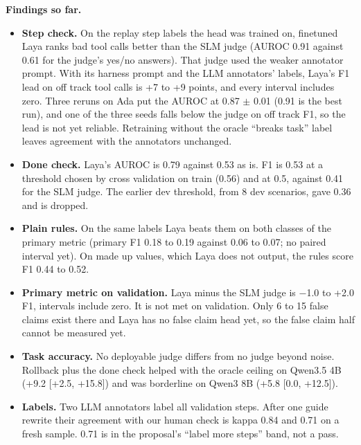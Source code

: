 \documentclass[10pt,a4paper]{article}
\begin{document}
\textbf{Findings so far.}
\begin{itemize}
  \item \textbf{Step check.} On the replay step labels the head was trained on, finetuned Laya ranks bad tool calls better than the SLM judge (AUROC 0.91 against 0.61 for the judge's yes/no answers). That judge used the weaker annotator prompt. With its harness prompt and the LLM annotators' labels, Laya's F1 lead on off track tool calls is +7 to +9 points, and every interval includes zero. Three reruns on Ada put the AUROC at 0.87 $\pm$ 0.01 (0.91 is the best run), and one of the three seeds falls below the judge on off track F1, so the lead is not yet reliable. Retraining without the oracle ``breaks task'' label leaves agreement with the annotators unchanged.
  \item \textbf{Done check.} Laya's AUROC is 0.79 against 0.53 as is. F1 is 0.53 at a threshold chosen by cross validation on train (0.56) and at 0.5, against 0.41 for the SLM judge. The earlier dev threshold, from 8 dev scenarios, gave 0.36 and is dropped.
  \item \textbf{Plain rules.} On the same labels Laya beats them on both classes of the primary metric (primary F1 0.18 to 0.19 against 0.06 to 0.07; no paired interval yet). On made up values, which Laya does not output, the rules score F1 0.44 to 0.52.
  \item \textbf{Primary metric on validation.} Laya minus the SLM judge is $-$1.0 to +2.0 F1, intervals include zero. It is not met on validation. Only 6 to 15 false claims exist there and Laya has no false claim head yet, so the false claim half cannot be measured yet.
  \item \textbf{Task accuracy.} No deployable judge differs from no judge beyond noise. Rollback plus the done check helped with the oracle ceiling on Qwen3.5 4B (+9.2 [+2.5, +15.8]) and was borderline on Qwen3 8B (+5.8 [0.0, +12.5]).
  \item \textbf{Labels.} Two LLM annotators label all validation steps. After one guide rewrite their agreement with our human check is kappa 0.84 and 0.71 on a fresh sample. 0.71 is in the proposal's ``label more steps'' band, not a pass.
\end{itemize}
\end{document}
